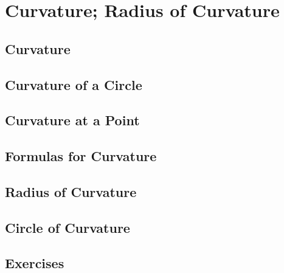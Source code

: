 \chapter{Curvature; Radius of Curvature}
\label{ch:12}

\section{Curvature}
\label{sec:12:01}

\section{Curvature of a Circle}
\label{sec:12:02}

\section{Curvature at a Point}
\label{sec:12:03}

\section{Formulas for Curvature}
\label{sec:12:04}

\section{Radius of Curvature}
\label{sec:12:05}

\section{Circle of Curvature}
\label{sec:12:06}

\section{Exercises}
\label{sec:12:07}
